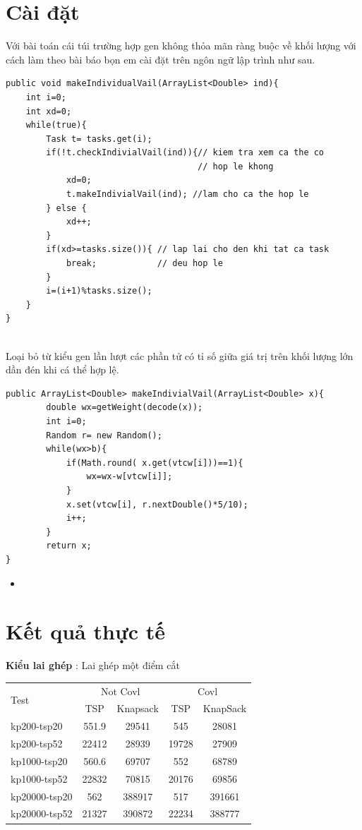 \documentclass[a4paper,12pt]{report}
\begin{document}
\section{Cài đặt} 
Với bài toán cái túi trường hợp gen không thỏa mãn ràng buộc về khối lượng với cách làm theo bài báo bọn em cài đặt trên ngôn ngữ lập trình như sau. 
\begin{lstlisting}
public void makeIndividualVail(ArrayList<Double> ind){
	int i=0;
	int xd=0;	
	while(true){
		Task t= tasks.get(i);
		if(!t.checkIndivialVail(ind)){// kiem tra xem ca the co		
									  // hop le khong
			xd=0;
			t.makeIndivialVail(ind); //lam cho ca the hop le
		} else {
			xd++;
		}
		if(xd>=tasks.size()){ // lap lai cho den khi tat ca task
			break;            // deu hop le
		}
		i=(i+1)%tasks.size();
	}
}
	
\end{lstlisting}
Loại bỏ từ kiểu gen lần lượt các phần tử có tỉ số giữa giá trị trên khối lượng lớn dần đén khi cá thể hợp lệ.
\begin{lstlisting}
public ArrayList<Double> makeIndivialVail(ArrayList<Double> x){
		double wx=getWeight(decode(x));
		int i=0;
		Random r= new Random();
		while(wx>b){
			if(Math.round( x.get(vtcw[i]))==1){
				wx=wx-w[vtcw[i]];
			}
			x.set(vtcw[i], r.nextDouble()*5/10);
			i++;
		}
		return x;
}
\end{lstlisting}
\begin{itemize}
\item 
\end{itemize}
\section{Kết quả thực tế}

\textbf{Kiểu lai ghép} : Lai ghép một điểm cắt


\begin{longtable}{|l |c |c |c |c|}
\hline
\multirow{2}{*}{Test} 
& \multicolumn{2}{c|}{Not Covl} &\multicolumn{2}{|c|}{Covl} \\
\cline{2-5}
&TSP & Knapsack & TSP & KnapSack \\
\hline
kp200-tsp20  & 551.9&29541 &545 &28081 
\\ \hline
kp200-tsp52&22412 &28939&19728 &27909 \\ \hline
kp1000-tsp20 &560.6&69707&552&68789 \\ \hline
kp1000-tsp52 &22832&70815&20176&69856 \\ \hline
kp20000-tsp20 &562&388917&517 &391661 \\ \hline
kp20000-tsp52 &21327&390872&22234& 388777\\ \hline
\end{longtable}
\end{document}
